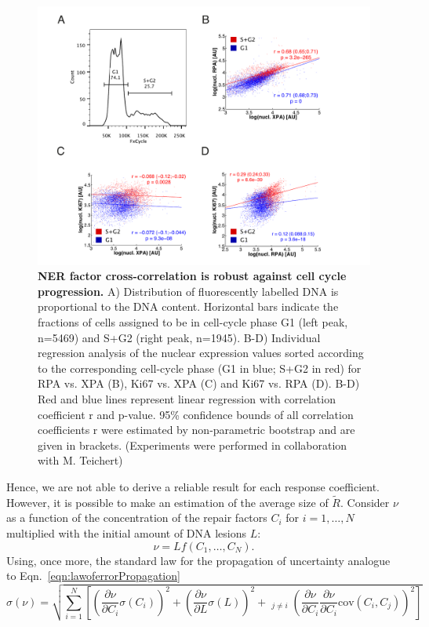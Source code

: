 \begin{figure}[t]
	\begin{center}
		\includegraphics[width=1\textwidth]{Abbildungen/figureTAC_4.pdf}
		\caption{\textbf{NER factor cross-correlation is robust against cell cycle progression.} A) Distribution of fluorescently labelled DNA is proportional to the DNA content. Horizontal bars indicate the fractions of cells assigned to be in cell-cycle phase G1 (left peak, n=5469) and S+G2 (right peak, n=1945).  B-D) Individual regression analysis of the nuclear expression values sorted according to the corresponding cell-cycle phase (G1 in blue; S+G2 in red) for RPA vs. XPA (B), Ki67 vs. XPA (C) and Ki67 vs. RPA (D). B-D) Red and blue lines represent linear regression with correlation coefficient r and p-value. 95\% confidence bounds of all correlation coefficients r were estimated by non-parametric bootstrap and are given in brackets. (Experiments were performed in collaboration with M. Teichert)}
		\label{fig:FC_cell_cycle}
	\end{center}
\end{figure}  
Hence, we are not able to derive a reliable result for each response coefficient. However, it is possible to make an estimation of the average size of $\tilde{R}$. Consider $\nu$ as a function of the concentration of the repair factors $C_i$ for $i=1,\ldots,N$ multiplied with the initial amount of DNA lesions $L$:
\begin{equation}
	\nu = Lf(C_1,\ldots,C_N).
\end{equation}
Using, once more, the standard law for the propagation of uncertainty analogue to Eqn.\ \ref{eqn:lawoferrorPropagation}
 \begin{equation}
 \sigma(\nu) = \sqrt{\sum_{i=1}^{N}\left[\left(\frac{\partial \nu}{\partial C_i}\sigma(C_i) \right)^2 + \left(\frac{\partial \nu}{\partial L}\sigma(L)\right)^2 + \mathop{\sum_{j=1}^{N}}_{j\neq i}\left(\frac{\partial \nu}{\partial C_i} \frac{\partial \nu}{\partial C_i}\textrm{cov}(C_i,C_j)\right)^2\right]}
 \end{equation}  
 
